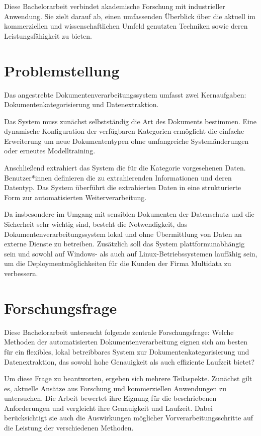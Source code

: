 Diese Bachelorarbeit verbindet akademische Forschung mit industrieller Anwendung. Sie zielt darauf ab, einen umfassenden Überblick über die aktuell im kommerziellen und wissenschaftlichen Umfeld genutzten Techniken sowie deren Leistungsfähigkeit zu bieten.

\section{Problemstellung}
\label{sec:problemstellung}

Das angestrebte Dokumentenverarbeitungssystem umfasst zwei Kernaufgaben: Dokumentenkategorisierung und Datenextraktion.

Das System muss zunächst selbstständig die Art des Dokuments bestimmen. Eine dynamische Konfiguration der verfügbaren Kategorien ermöglicht die einfache Erweiterung um neue Dokumententypen ohne umfangreiche Systemänderungen oder erneutes Modelltraining.

Anschließend extrahiert das System die für die Kategorie vorgesehenen Daten. Benutzer*innen definieren die zu extrahierenden Informationen und deren Datentyp. Das System überführt die extrahierten Daten in eine strukturierte Form zur automatisierten Weiterverarbeitung.

Da insbesondere im Umgang mit sensiblen Dokumenten der Datenschutz und die Sicherheit sehr wichtig sind, besteht die Notwendigkeit, das Dokumentenverarbeitungssystem lokal und ohne Übermittlung von Daten an externe Dienste zu betreiben. Zusätzlich soll das System plattformunabhängig sein und sowohl auf Windows- als auch auf Linux-Betriebssystemen lauffähig sein, um die Deploymentmöglichkeiten für die Kunden der Firma Multidata zu verbessern.

\section{Forschungsfrage}
\label{sec:forschungsfrage}
Diese Bachelorarbeit untersucht folgende zentrale Forschungsfrage:
Welche Methoden der automatisierten Dokumentenverarbeitung eignen sich am besten für ein flexibles, lokal betreibbares System zur Dokumentenkategorisierung und Datenextraktion, das sowohl hohe Genauigkeit als auch effiziente Laufzeit bietet?

Um diese Frage zu beantworten, ergeben sich mehrere  Teilaspekte. Zunächst gilt es, aktuelle Ansätze aus Forschung und kommerziellen Anwendungen zu untersuchen. Die Arbeit bewertet ihre Eignung für die beschriebenen Anforderungen und vergleicht ihre Genauigkeit und Laufzeit. Dabei berücksichtigt sie auch die Auswirkungen möglicher Vorverarbeitungsschritte auf die Leistung der verschiedenen Methoden.

